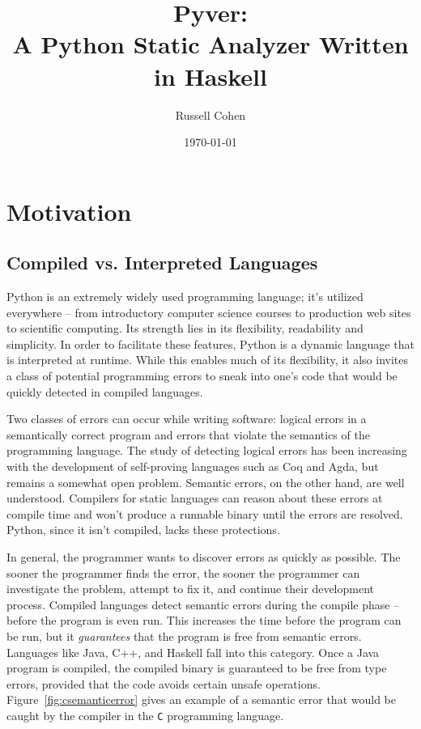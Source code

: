\documentclass{article}[12pt]
\author{Russell Cohen}
\title{Pyver: \\ A Python Static Analyzer Written in Haskell}
\date{\today}
\begin{document}
\renewcommand{\theFancyVerbLine}{
      \sffamily\textcolor[rgb]{0.5,0.5,0.5}{\scriptsize\arabic{FancyVerbLine}}}

\maketitle
\section{Motivation}

\subsection{Compiled vs. Interpreted Languages}
\doublespacing

Python is an extremely widely used programming language; it's utilized everywhere -- from
introductory computer science courses to production web sites to scientific computing. Its strength
lies in its flexibility, readability and simplicity. In order to facilitate these features, Python
is a dynamic language that is interpreted at runtime. While this enables much of its
flexibility, it also invites a class of potential programming errors to sneak into one's code that
would be quickly detected in compiled languages.

Two classes of errors can occur while writing software: logical errors in a semantically correct program and
errors that violate the semantics of the programming language. The study of detecting logical errors has been
increasing with the development of self-proving languages such as Coq and Agda, but remains a somewhat open problem.
Semantic errors, on the other hand, are well understood. Compilers for static languages can reason about these
errors at compile time and won't produce a runnable binary until the errors are resolved. Python, since it isn't
compiled, lacks these protections.

In general, the programmer wants to discover errors as quickly as possible. The sooner the
programmer finds the error, the sooner the programmer can investigate the problem, attempt to fix it, and
continue their development process. Compiled languages detect semantic errors during the compile phase
-- before the program is even run. This increases the time before the program can be run, but it
\emph{guarantees} that the program is free from semantic errors. Languages like Java, C++, and Haskell
fall into this category. Once a Java program is compiled, the compiled binary is guaranteed to be
free from type errors, provided that the code avoids certain unsafe operations.
Figure~\ref{fig:csemanticerror} gives an example of a semantic error that would be caught by the
compiler in the \texttt{C} programming language. 
\end{document}
